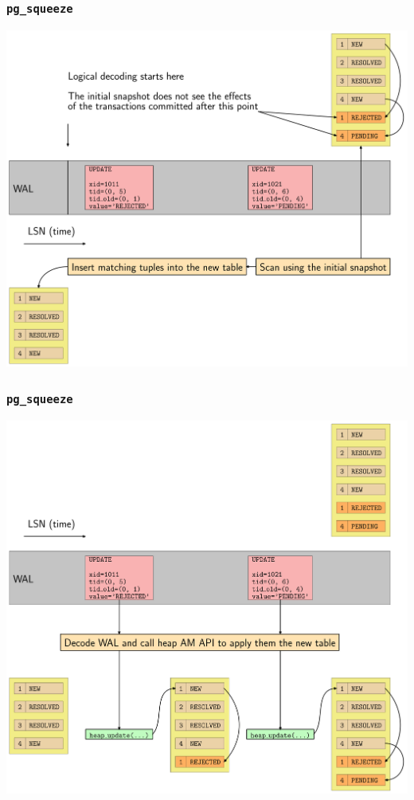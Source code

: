 \begin{frame}
  \frametitle{\texttt{pg\_squeeze}}
  \vspace{-0.5cm}
  \begin{center}
    \includegraphics[height=0.9\textheight]{images/pg_squeeze_02.png}
  \end{center}
\end{frame}

\begin{frame}
  \frametitle{\texttt{pg\_squeeze}}
  \vspace{-0.5cm}
  \begin{center}
    \includegraphics[height=0.9\textheight]{images/pg_squeeze_03.png}
  \end{center}
\end{frame}

